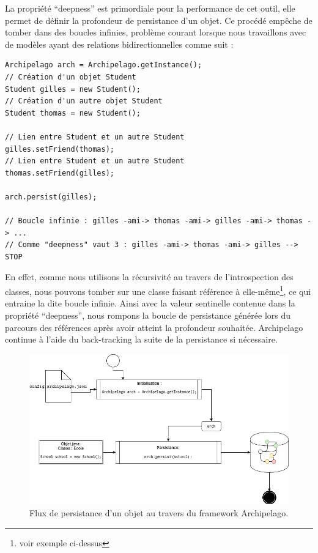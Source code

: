 \documentclass[a4paper,fleqn,12pt,oneside]{report}
\begin{document}
La propriété \enquote{deepness} est primordiale pour la performance de cet outil, elle permet de définir la profondeur de persistance d'un objet. Ce procédé empêche de tomber dans des boucles infinies, problème courant lorsque nous travaillons avec de modèles ayant des relations bidirectionnelles comme suit : 

\begin{lstlisting}
Archipelago arch = Archipelago.getInstance();
// Création d'un objet Student
Student gilles = new Student();
// Création d'un autre objet Student
Student thomas = new Student();

// Lien entre Student et un autre Student
gilles.setFriend(thomas);
// Lien entre Student et un autre Student
thomas.setFriend(gilles);

arch.persist(gilles);

// Boucle infinie : gilles -ami-> thomas -ami-> gilles -ami-> thomas -> ...
// Comme "deepness" vaut 3 : gilles -ami-> thomas -ami-> gilles --> STOP
\end{lstlisting}

En effet, comme nous utilisons la récursivité au travers de l'introspection des classes, nous pouvons tomber sur une classe faisant référence à elle-même\footnote{voir exemple ci-dessus}, ce qui entraine la dite boucle infinie. Ainsi avec la valeur sentinelle contenue dans la propriété \enquote{deepness}, nous rompons la boucle de persistance générée lors du parcours des références après avoir atteint la profondeur souhaitée. Archipelago continue à l'aide du back-tracking la suite de la persistance si nécessaire.

\begin{figure}[!h]
\centering
\includegraphics[scale=0.6]{figures/Persist.png}
\caption{Flux de persistance d'un objet au travers du framework Archipelago.}
\label{fig:Persist}
\end{figure}
    
\end{document}
